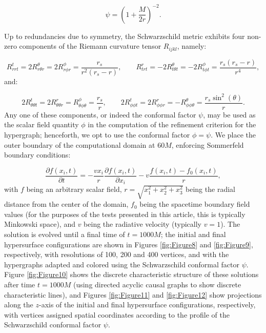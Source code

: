 \documentclass{article}
\begin{document}
\begin{equation}
\psi = \left( 1 + \frac{M}{2r} \right)^{-2}.
\end{equation}

Up to redundancies due to symmetry, the Schwarzschild metric exhibits four non-zero components of the Riemann curvature tensor ${R_{i j k l}}$, namely:

\begin{equation}
R_{r r t}^{t} = 2 R_{r \theta r}^{\theta} = 2 R_{r \phi r}^{\phi} = \frac{r_s}{r^2 \left( r_s - r \right)}, \qquad R_{t r t}^{r} = -2 R_{t \theta t}^{\theta} = -2 R_{t \phi t}^{\phi} = \frac{r_s \left( r_s - r \right)}{r^4},
\end{equation}
and:

\begin{equation}
2 R_{\theta \theta t}^{t} = 2 R_{\theta \theta r}^{r} = R_{\theta \phi \theta}^{\phi} = \frac{r_s}{r}, \qquad 2 R_{\phi \phi t}^{t} = 2 R_{\phi \phi r}^{r} = - R_{\phi \phi \theta}^{\theta} = \frac{r_s \sin^2 \left( \theta \right)}{r}.
\end{equation}
Any one of these components, or indeed the conformal factor ${\psi}$, may be used as the scalar field quantity ${\phi}$ in the computation of the refinement criterion for the hypergraph; henceforth, we opt to use the conformal factor ${\phi = \psi}$. We place the outer boundary of the computational domain at ${60 M}$, enforcing Sommerfeld boundary conditions:

\begin{equation}
\frac{\partial f \left( x_i, t \right)}{\partial t} = - \frac{v x_i}{r} \frac{\partial f \left( x_i, t \right)}{\partial x_i} - v \frac{f \left( x_i, t \right) - f_0 \left( x_i, t \right)}{r},
\end{equation}
with $f$ being an arbitrary scalar field, ${r = \sqrt{x_{1}^{2} + x_{2}^{2} + x_{3}^{2}}}$ being the radial distance from the center of the domain, ${f_0}$ being the spacetime boundary field values (for the purposes of the tests presented in this article, this is typically Minkowski space), and $v$ being the radiative velocity (typically ${v = 1}$). The solution is evolved until a final time of ${t = 1000 M}$; the initial and final hypersurface configurations are shown in Figures \ref{fig:Figure8} and \ref{fig:Figure9}, respectively, with resolutions of 100, 200 and 400 vertices, and with the hypergraphs adapted and colored using the Schwarzschild conformal factor ${\psi}$. Figure \ref{fig:Figure10} shows the discrete characteristic structure of these solutions after time ${t = 1000 M}$ (using directed acyclic causal graphs to show discrete characteristic lines), and Figures \ref{fig:Figure11} and \ref{fig:Figure12} show projections along the $z$-axis of the initial and final hypersurface configurations, respectively, with vertices assigned spatial coordinates according to the profile of the Schwarzschild conformal factor ${\psi}$.
\end{document}
